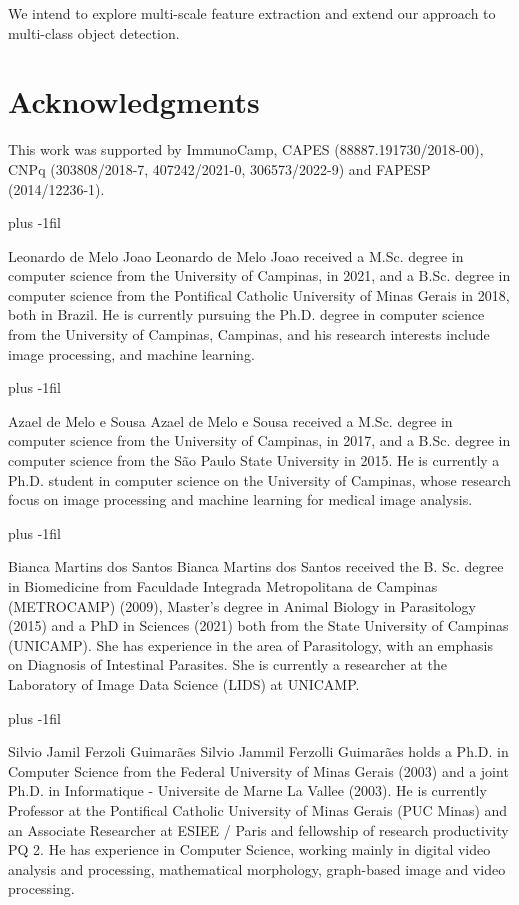 \documentclass[10pt,twocolumn,twoside]{IEEEtran}
\begin{document}
    We intend to explore multi-scale feature extraction and extend our approach to multi-class object detection.

\section*{Acknowledgments}
This work was supported by ImmunoCamp, CAPES (88887.191730/2018-00), CNPq (303808/2018-7, 407242/2021-0, 306573/2022-9) and FAPESP (2014/12236-1).




\baselineskip plus -1fil
\begin{IEEEbiographynophoto}{Leonardo de Melo Joao}
Leonardo de Melo Joao received a M.Sc. degree in computer science from the University of Campinas, in 2021, and a B.Sc. degree in computer science from the Pontifical Catholic University of Minas Gerais in 2018, both in Brazil. He is currently pursuing the Ph.D. degree in computer science from the University of Campinas, Campinas, and his research interests include image processing, and machine learning.
\end{IEEEbiographynophoto}
\baselineskip plus -1fil
\begin{IEEEbiographynophoto}{Azael de Melo e Sousa}
Azael de Melo e Sousa received a M.Sc. degree in computer science from the University of Campinas, in 2017, and a B.Sc. degree in computer science from the São Paulo State University in 2015. He is currently a Ph.D. student in computer science on the University of Campinas, whose research focus on image processing and machine learning for medical image analysis.
\end{IEEEbiographynophoto}
\baselineskip plus -1fil
\begin{IEEEbiographynophoto}{Bianca Martins dos Santos}
Bianca Martins dos Santos received the B. Sc. degree in Biomedicine from Faculdade Integrada Metropolitana de Campinas (METROCAMP) (2009), Master's degree in Animal Biology in Parasitology (2015) and a PhD in Sciences (2021) both from the State University of Campinas (UNICAMP). She has experience in the area of Parasitology, with an emphasis on Diagnosis of Intestinal Parasites. She is currently a researcher at the Laboratory of Image Data Science (LIDS) at UNICAMP.
\end{IEEEbiographynophoto}
\baselineskip plus -1fil
\begin{IEEEbiographynophoto}{Silvio Jamil Ferzoli Guimarães}
Silvio Jammil Ferzolli Guimarães holds a Ph.D. in Computer Science from the Federal University of Minas Gerais (2003) and a joint Ph.D. in Informatique - Universite de Marne La Vallee (2003). He is currently Professor at the Pontifical Catholic University of Minas Gerais (PUC Minas) and an Associate Researcher at ESIEE / Paris and fellowship of research productivity PQ 2. He has experience in Computer Science, working mainly in digital video analysis and processing, mathematical morphology, graph-based image and video processing.
\end{IEEEbiographynophoto}
\end{document}
